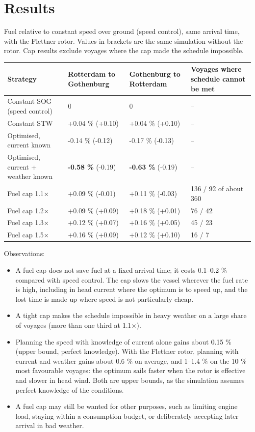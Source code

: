 \documentclass[a4paper,11pt]{article}
\begin{document}
\section{Results}
\label{sec:org4e46334}

Fuel relative to constant speed over ground (speed control), same
arrival time, with the Flettner rotor.  Values in brackets are the same
simulation without the rotor.  Cap results exclude voyages where the
cap made the schedule impossible.

\begin{center}
\small
\begin{tabular}{p{5.6cm}p{2.6cm}p{2.6cm}p{3.2cm}}
Strategy & Rotterdam to Gothenburg & Gothenburg to Rotterdam & Voyages where schedule cannot be met\\[0pt]
\hline
Constant SOG (speed control) & 0 & 0 & --\\[0pt]
Constant STW & +0.04 \% (+0.10) & +0.04 \% (+0.10) & --\\[0pt]
Optimised, current known & -0.14 \% (-0.12) & -0.17 \% (-0.13) & --\\[0pt]
Optimised, current + weather known & \textbf{-0.58 \%} (-0.19) & \textbf{-0.63 \%} (-0.19) & --\\[0pt]
Fuel cap 1.1\(\times\) & +0.09 \% (-0.01) & +0.11 \% (-0.03) & 136 / 92 of about 360\\[0pt]
Fuel cap 1.2\(\times\) & +0.09 \% (+0.09) & +0.18 \% (+0.01) & 76 / 42\\[0pt]
Fuel cap 1.3\(\times\) & +0.12 \% (+0.07) & +0.16 \% (+0.05) & 45 / 23\\[0pt]
Fuel cap 1.5\(\times\) & +0.16 \% (+0.09) & +0.12 \% (+0.10) & 16 / 7\\[0pt]
\end{tabular}
\end{center}

Observations:
\begin{itemize}
\item A fuel cap does not save fuel at a fixed arrival time; it costs
0.1--0.2 \% compared with speed control.  The cap slows the vessel
wherever the fuel rate is high, including in head current where the
optimum is to speed up, and the lost time is made up where speed is
not particularly cheap.
\item A tight cap makes the schedule impossible in heavy weather on a large
share of voyages (more than one third at 1.1\(\times\)).
\item Planning the speed with knowledge of current alone gains about
0.15 \% (upper bound, perfect knowledge).  With the Flettner rotor, planning with current and weather
gains about 0.6 \% on average, and 1--1.4 \% on the 10 \% most
favourable voyages: the optimum sails faster when the rotor is
effective and slower in head wind.  Both are upper bounds, as the
simulation assumes perfect knowledge of the conditions.
\item A fuel cap may still be wanted for other purposes, such as limiting
engine load, staying within a consumption budget, or deliberately
accepting later arrival in bad weather.
\end{itemize}
\end{document}
